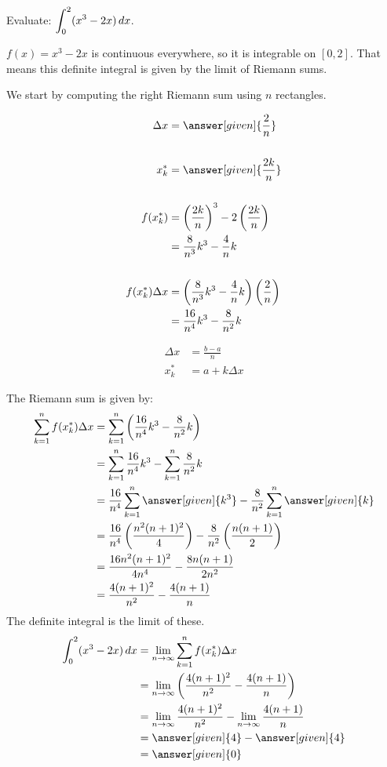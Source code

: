 \documentclass{ximera}
\begin{document}
\begin{example}
	Evaluate: $\displaystyle \int_0^2 (x^3-2x) \mathop{}\!d x$.
	\begin{explanation}
		$f(x)=x^3-2x$ is continuous everywhere, so it is integrable on $[0,2]$.  That means this definite integral is given by the limit of Riemann sums.
		
		We start by computing the right Riemann sum using $n$ rectangles. 
		
		\begin{align*}
			\Delta x &= \answer[given]{\frac{2}{n}} \\ \\
			x_k^* &= \answer[given]{\frac{2k}{n}}\\ \\
			f(x_k^*) &= \left( \frac{2k}{n}\right)^3 - 2\left(\frac{2k}{n}\right)\\
				&= \frac{8}{n^3}k^3 - \frac{4}{n}k \\  \\
			f(x_k^*)\Delta x &= \left(\frac{8}{n^3}k^3 - \frac{4}{n}k\right) \left( \frac{2}{n}\right)\\
				&= \frac{16}{n^4}k^3 - \frac{8}{n^2}k
		\end{align*}				
		\begin{hint}
			\begin{align*}
				\Delta x &= \frac{b-a}{n}\\
				x_k^* &= a + k\Delta x
			\end{align*}
		\end{hint}
		The Riemann sum is given by:
		\begin{align*}
			\sum_{k=1}^n f(x_k^*)\Delta x &= \sum_{k=1}^n \left(\frac{16}{n^4}k^3 - \frac{8}{n^2}k \right)\\
				&= \sum_{k=1}^n \frac{16}{n^4}k^3 - \sum_{k=1}^n \frac{8}{n^2}k \\
				&= \frac{16}{n^4} \sum_{k=1}^n \answer[given]{k^3} - \frac{8}{n^2}\sum_{k=1}^n \answer[given]{k} \\
				&= \frac{16}{n^4} \left( \frac{n^2(n+1)^2}{4} \right) - \frac{8}{n^2}\left( \frac{n(n+1)}{2} \right) \\
				&= \frac{16n^2(n+1)^2}{4n^4} - \frac{8n(n+1)}{2n^2} \\
				&= \frac{4(n+1)^2}{n^2} - \frac{4(n+1)}{n}
		\end{align*}
		The definite integral is the limit of these.
		\begin{align*}
			\int_0^2 (x^3-2x) \d x &= \lim_{n\to \infty}\sum_{k=1}^n f(x_k^*)\Delta x \\
				&= \lim_{n\to\infty} \left(\frac{4(n+1)^2}{n^2} - \frac{4(n+1)}{n}\right) \\
				&= \lim_{n\to\infty} \frac{4(n+1)^2}{n^2} - \lim_{n\to\infty} \frac{4(n+1)}{n} \\
				&= \answer[given]{4} - \answer[given]{4}\\
				&= \answer[given]{0}
		\end{align*}
	\end{explanation}
\end{example}
\end{document}
